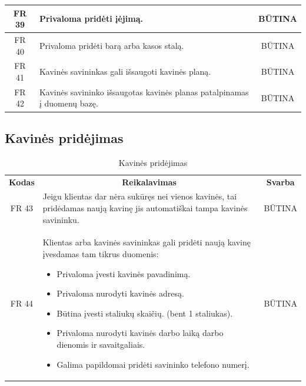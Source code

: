 \documentclass{VUMIFPSkursinis}
\begin{document}
{{{{{\begin{center}
\begin{table}[H]
\begin{tabular}{|p{2cm}|p{}|p{}|}
		\multicolumn{1}{|c|}{FR 39}&
		{Privaloma pridėti įėjimą.}&
		\multicolumn{1}{|c|}{BŪTINA}\\				
	\hline
	
		\multicolumn{1}{|c|}{FR 40}&
		{Privaloma pridėti barą arba kasos stalą.}&
		\multicolumn{1}{|c|}{BŪTINA}\\				
	\hline
	
		\multicolumn{1}{|c|}{FR 41}&
		{Kavinės savininkas gali išsaugoti kavinės planą.}&
		\multicolumn{1}{|c|}{BŪTINA}\\				
	\hline
	
		\multicolumn{1}{|c|}{FR 42}&
		{Kavinės savininko išsaugotas kavinės planas patalpinamas į duomenų bazę.}&
		\multicolumn{1}{|c|}{BŪTINA}\\				
	\hline
	
	\end{tabular}
	
	\label{table:KavinėsPlanavimas}
	\end{table}
	
	
\end{center}

\pagebreak

\subsection{Kavinės pridėjimas}
\begin{center}
	\begin{table}[H]
	\caption{Kavinės pridėjimas}
	\begin{tabular}{|p{2cm}|p{}|p{}|}
	
	\hline
	    \rowcolor{lightgray}
		\multicolumn{3}{|c|}{Kavinės pridėjimas}\\
		
	\hline
		\multicolumn{1}{|c|}{{\bfseries Kodas}}&
		\multicolumn{1}{|c|}{{\bfseries Reikalavimas}}&
		\multicolumn{1}{|c|}{{\bfseries Svarba}}\\

	\hline
		\multicolumn{1}{|c|}{FR 43}&
		{Jeigu klientas dar nėra sukūręs nei vienos kavinės, tai pridėdamas naują kavinę jis automatiškai tampa kavinės savininku.}&
		\multicolumn{1}{|c|}{BŪTINA}\\	

	\hline
		\multicolumn{1}{|c|}{FR 44}&
		{Klientas arba kavinės savininkas gali pridėti naują kavinę įvesdamas tam tikrus duomenis:
			\begin{itemize}
				\item Privaloma įvesti kavinės pavadinimą.
				\item Privaloma nurodyti kavinės adresą.
				\item Būtina įvesti staliukų skaičių. (bent 1 staliukas).
				\item Privaloma nurodyti kavinės darbo laiką darbo dienomis ir savaitgaliais.
				\item Galima papildomai pridėti savininko telefono numerį.
			\end{itemize}}&
		\multicolumn{1}{|c|}{BŪTINA}\\	


\end{tabular}
\end{table}
\end{center}}}}}}
\end{document}

